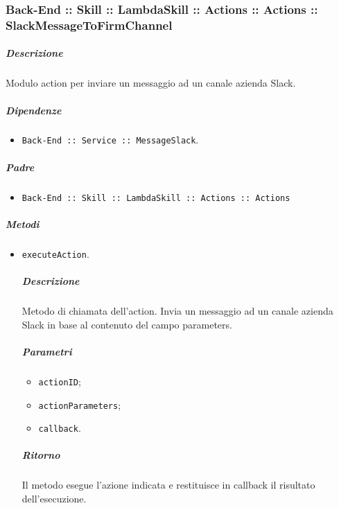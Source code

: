 \documentclass[../ManualeSviluppatore_v1.0.0.tex]{subfiles}
\begin{document}
\subsubsection{Back-End :: Skill :: LambdaSkill :: Actions :: Actions :: SlackMessageToFirmChannel}
\subparagraph{Descrizione} Modulo action per inviare un messaggio ad un canale azienda Slack.
\subparagraph{Dipendenze}
\begin{itemize}
	\item \texttt{Back-End :: Service :: MessageSlack}.
\end{itemize}
\subparagraph{Padre}
\begin{itemize}
	\item \texttt{Back-End :: Skill :: LambdaSkill :: Actions :: Actions}
\end{itemize}
\subparagraph{Metodi}
\begin{itemize}
	\item \texttt{executeAction}.
	      \subparagraph{Descrizione} Metodo di chiamata dell'action. Invia un messaggio ad un canale azienda Slack in base al contenuto del campo parameters.
	      \subparagraph{Parametri}
	      \begin{itemize}
	      	\item \texttt{actionID};
	      	\item \texttt{actionParameters};
	      	\item \texttt{callback}.
	      \end{itemize}
	      \subparagraph{Ritorno} Il metodo esegue l'azione indicata e restituisce in callback il risultato dell'esecuzione.
\end{itemize}
\end{document}
